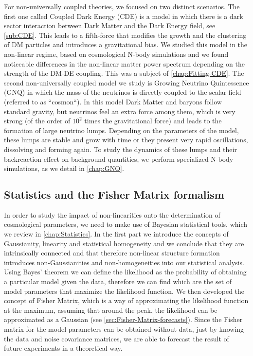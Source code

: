 For non-universally coupled theories, we focused on two distinct scenarios. The first one called Coupled Dark Energy
(CDE) is a model in which there is a dark sector interaction between Dark Matter and the Dark Energy field, see \cref{sub:CDE}. This leads to a fifth-force that modifies the growth and the clustering of DM particles and introduces a gravitational bias.
We studied this model in the non-linear regime, based on cosmological N-body simulations and we found
noticeable differences in the non-linear matter power spectrum depending on the strength of the DM-DE coupling. This was a subject of \cref{chap:Fitting-CDE}.
The second non-universally coupled model we study is Growing Neutrino Quintessence (GNQ) in which
the mass of the neutrinos is directly coupled to the scalar field (referred to as ``cosmon``).
In this model Dark Matter and baryons follow standard gravity, but neutrinos feel an extra force among them, which
is very strong (of the order of $10^2$ times the gravitational force) and leads to the formation of large neutrino lumps. Depending on the parameters of the model, these lumps are stable and grow with time
or they present very rapid oscillations, dissolving and forming again. To study the dynamics of these lumps
and their backreaction effect on background quantities, we perform specialized N-body simulations, as we 
detail in \cref{chap:GNQ}. 

\subsection*{Statistics and the Fisher Matrix formalism}

In order to study the impact of non-linearities onto the determination of cosmological parameters,
we need to make use of Bayesian statistical tools, which we review in \cref{chap:Statistics}. 
In the first part we introduce the concepts of Gaussianity, linearity and statistical homogeneity and 
we conclude that they are intrinsically connected and that therefore non-linear structure formation
introduces non-Gaussianities and non-homogeneities into our statistical analysis.
Using Bayes' theorem we can define the likelihood as the probability of obtaining a particular model given the data, therefore
we can find which are the set of model parameters that maximize the likelihood function.
We then developed the concept of Fisher Matrix, which is a way of approximating the likelihood function at the maximum, 
assuming that around the peak, the likelihood can be approximated as a Gaussian (see \cref{sec:Fisher-Matrix-forecasts}).
Since the Fisher matrix for the model parameters can be obtained without data, just by knowing the data and noise covariance matrices,
we are able to forecast the result of future experiments in a theoretical way.

